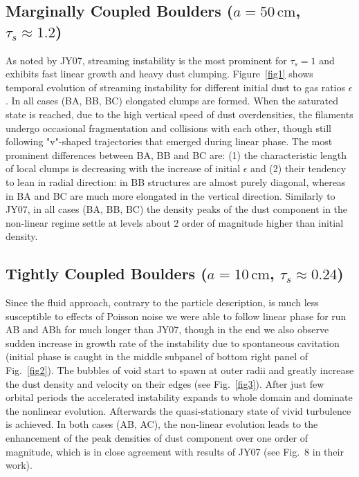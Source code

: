 \subsection{Marginally Coupled Boulders ($a=50\,\textrm{cm}$, $\tau_s\approx
1.2$)\label{marg_boulders}}
%
As noted by JY07, streaming instability is the most prominent for $\tau_s = 1$
and exhibits fast linear growth and heavy dust clumping.  Figure~\ref{fig1}
shows temporal evolution of streaming instability for different initial dust to
gas ratios $\epsilon$. In all cases (BA, BB, BC) elongated clumps are formed.
When the saturated state is reached, due to the high vertical speed of dust
overdensities, the filaments undergo occasional fragmentation and collisions
with each other, though still following "v"-shaped trajectories that emerged
during linear phase. The most prominent differences between BA, BB and BC are:
(1) the characteristic length of local clumps is decreasing with the increase of
initial $\epsilon$ and (2) their tendency to lean in radial direction: in BB
structures are almost purely diagonal, whereas in BA and BC are much more
elongated in the vertical direction.
Similarly to JY07, in all cases (BA, BB, BC) the density peaks of the dust
component in the non-linear regime settle at levels about 2 order of magnitude
higher than initial density.

\subsection{Tightly Coupled Boulders ($a=10\,\textrm{cm}$, $\tau_s\approx 0.24$)
\label{tight_boulders}}

Since the fluid approach, contrary to the particle description, is much less
susceptible to effects of Poisson noise we were able to follow linear phase for
run AB and ABh for much longer than JY07, though in the end we also observe
sudden increase in growth rate of the instability due to spontaneous cavitation
(initial phase is caught in the middle subpanel of bottom right panel of
Fig.~\ref{fig2}).
The bubbles of void start to spawn at outer radii and greatly increase the dust
density and velocity on their edges (see Fig.~\ref{fig3}). After just
few orbital periods the accelerated instability expands to whole domain and
dominate the nonlinear evolution. Afterwards the quasi-stationary state of
vivid turbulence is achieved. 
In both cases (AB, AC), the non-linear evolution leads to the enhancement
of the peak densities of dust component over one order of magnitude, which is in
close agreement with results of JY07 (see Fig.~8 in their work).

